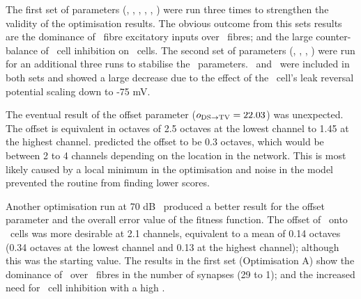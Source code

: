 The first set of parameters (\nDSTV, \wDSTV, \nLSRTV, \nHSRTV, \wLSRTV, \wHSRTV)
were run three times to strengthen the validity of the optimisation results. The
obvious outcome from this sets results are the dominance of \LSR~fibre
excitatory inputs over \HSR~fibres; and the large counter-balance of \DS~cell
inhibition on \TV~cells. The second set of parameters (\sDSTV, \Eleak
\oDSTV, \nDSTV, \wDSTV) were run for an additional three runs to stabilise the
\DSTV~parameters.  \nDSTV~and \wDSTV~were included in both sets and showed a
large decrease due to the effect of the \TV~cell's leak reversal potential
\Eleak scaling down to -75 mV\@.


The eventual result of the offset parameter ($\protect o_{\protect\textrm{{DS}}\to\textrm{{TV}}} = 22.03$) was
unexpected. The offset is equivalent in octaves of 2.5 octaves at the lowest
channel to 1.45 at the highest channel. \citet{ReissYoung:2005} predicted the
offset to be 0.3 octaves, which would be between 2 to 4 channels depending on
the location in the network. This is most likely caused by a local minimum in
the optimisation and noise in the model prevented the routine from finding lower
scores.


Another optimisation run at 70 dB \SPL~produced a better result for the offset
parameter and the overall error value of the fitness function.  The offset of
\DS~onto \TV~cells was more desirable at 2.1 channels, equivalent to a mean of
0.14 octaves (0.34 octaves at the lowest channel and 0.13 at the highest
channel); although this was the starting value.  The results in the first set
(Optimisation A) show the dominance of \LSR~over \HSR~fibres in the number of
synapses (29 to 1); and the increased need for \DS~cell inhibition with a high
\nDSTV.

